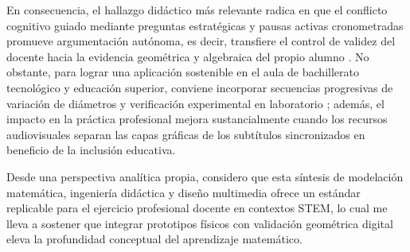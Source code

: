 \documentclass[spanish,letterpaper,oneside]{article}
\begin{document}
En consecuencia, el hallazgo didáctico más relevante radica en que el conflicto cognitivo guiado mediante preguntas estratégicas y pausas activas cronometradas promueve argumentación autónoma, es decir, transfiere el control de validez del docente hacia la evidencia geométrica y algebraica del propio alumno \citep{polya1945,duval2006}. No obstante, para lograr una aplicación sostenible en el aula de bachillerato tecnológico y educación superior, conviene incorporar secuencias progresivas de variación de diámetros y verificación experimental en laboratorio \citep{sep2023_mccems}; además, el impacto en la práctica profesional mejora sustancialmente cuando los recursos audiovisuales separan las capas gráficas de los subtítulos sincronizados en beneficio de la inclusión educativa.

Desde una perspectiva analítica propia, considero que esta síntesis de modelación matemática, ingeniería didáctica y diseño multimedia ofrece un estándar replicable para el ejercicio profesional docente en contextos STEM, lo cual me lleva a sostener que integrar prototipos físicos con validación geométrica digital eleva la profundidad conceptual del aprendizaje matemático.

\newsavebox{\hiddenbibbox}
\begin{lrbox}{\hiddenbibbox}\begin{minipage}{\textwidth}\end{minipage}\end{lrbox}
\end{document}
